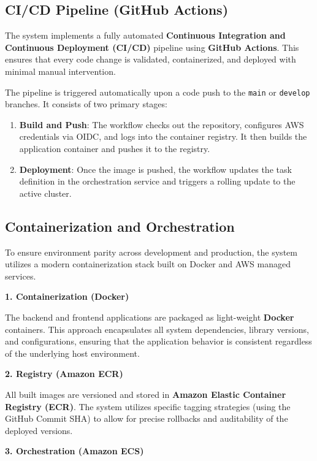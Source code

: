 \subsection{CI/CD Pipeline (GitHub Actions)}

The system implements a fully automated \textbf{Continuous Integration and Continuous Deployment (CI/CD)} pipeline using \textbf{GitHub Actions}. This ensures that every code change is validated, containerized, and deployed with minimal manual intervention.

The pipeline is triggered automatically upon a code push to the \texttt{main} or \texttt{develop} branches. It consists of two primary stages:
\begin{enumerate}
    \item \textbf{Build and Push}: The workflow checks out the repository, configures AWS credentials via OIDC, and logs into the container registry. It then builds the application container and pushes it to the registry.
    \item \textbf{Deployment}: Once the image is pushed, the workflow updates the task definition in the orchestration service and triggers a rolling update to the active cluster.
\end{enumerate}

\subsection{Containerization and Orchestration}

To ensure environment parity across development and production, the system utilizes a modern containerization stack built on Docker and AWS managed services.

\textbf{1. Containerization (Docker)}

The backend and frontend applications are packaged as light-weight \textbf{Docker} containers. This approach encapsulates all system dependencies, library versions, and configurations, ensuring that the application behavior is consistent regardless of the underlying host environment.

\textbf{2. Registry (Amazon ECR)}

All built images are versioned and stored in \textbf{Amazon Elastic Container Registry (ECR)}. The system utilizes specific tagging strategies (using the GitHub Commit SHA) to allow for precise rollbacks and auditability of the deployed versions.

\textbf{3. Orchestration (Amazon ECS)}

